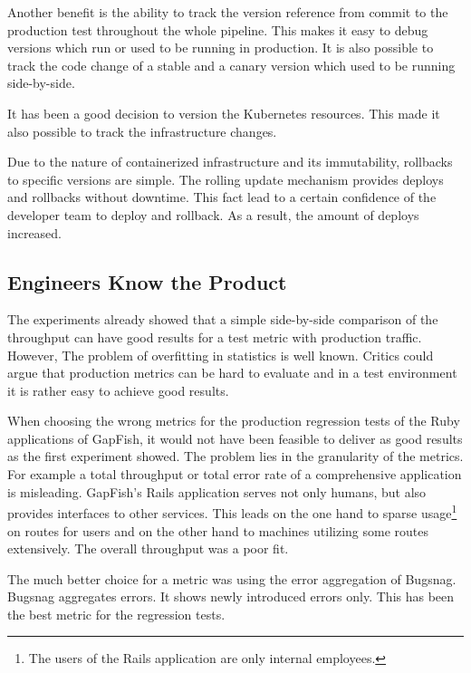 Another benefit is the ability to track the version reference from commit to the production
test throughout the whole pipeline. This makes it easy to debug versions
which run or used to be running in production. It is also possible to track the code
change of a stable and a canary version which used to be running side-by-side.

It has been a good decision to version the Kubernetes resources. This made it also possible to track the
infrastructure changes.

Due to the nature of containerized infrastructure and its immutability, rollbacks to
specific versions are simple. The rolling update mechanism provides deploys and rollbacks
without downtime. This fact lead to a certain confidence of the developer team to deploy
and rollback. As a result, the amount of deploys increased.

\subsection{Engineers Know the Product}

The experiments already showed that a simple side-by-side comparison of the throughput can
have good results for a test metric with production traffic. However, The problem of overfitting in statistics is well known. Critics could argue that
production metrics can be hard to evaluate and in a test environment it is rather easy to
achieve good results.

When choosing the wrong metrics for the production regression tests of the Ruby
applications of GapFish, it would not have been feasible to deliver as good results as the
first experiment showed. The problem lies in the granularity of the metrics. For example a total
throughput or total error rate of a comprehensive application is misleading. GapFish's
Rails application serves not only humans, but also provides interfaces to other
services. This leads on the one hand to sparse usage\footnote{The users of the Rails
  application are only internal employees.} on routes for users and on the other hand
to machines utilizing some routes extensively. The overall throughput was a poor fit.

The much better choice for a metric was using the error aggregation of Bugsnag. Bugsnag
aggregates errors. It shows newly introduced errors only. This has been the
best metric for the regression tests.


